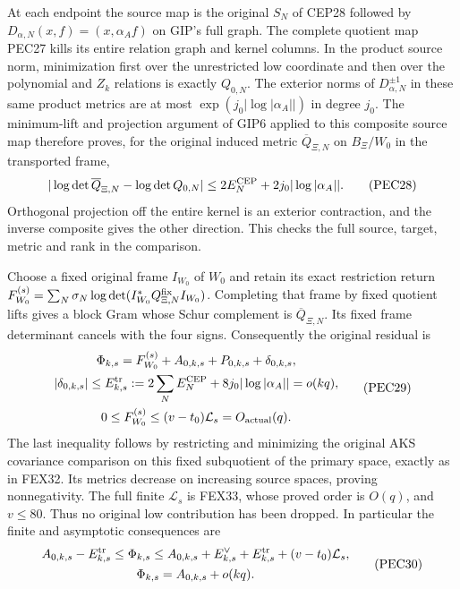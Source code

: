 \documentclass[11pt,a4paper]{article}
\begin{document}
At each endpoint the source map is the original $S_N$ of CEP28
followed by $D_{\alpha,N}(x,f)=(x,\alpha_Af)$ on GIP's full graph.
The complete quotient map PEC27 kills its entire relation graph and
kernel columns. In the product source norm, minimization first over
the unrestricted low coordinate and then over the polynomial and
$Z_k$ relations is exactly $Q_{0,N}$. The exterior norms of
$D_{\alpha,N}^{\pm1}$ in these same product metrics are at most
$\exp(j_0|\log|\alpha_A||)$ in degree $j_0$.
The minimum-lift and projection argument of GIP6 applied to this
composite source map therefore proves, for the original induced
metric $\overline Q_{\Xi,N}$ on $B_\Xi/W_0$ in the transported frame,
\[
 |\log\det\overline Q_{\Xi,N}-\log\det Q_{0,N}|
 \le2E_N^{\rm CEP}+2j_0|\log|\alpha_A||.
 \tag{PEC28}
\]
Orthogonal projection off the entire kernel is an exterior contraction,
and the inverse composite gives the other direction. This checks the
full source, target, metric and rank in the comparison.

Choose a fixed original frame $I_{W_0}$ of $W_0$ and retain its exact
restriction return
$F_{W_0}^{(s)}=\sum_N\sigma_N\log\det(I_{W_0}^*Q_{\Xi,N}^{\rm fix}I_{W_0})$.
Completing that frame by fixed quotient lifts gives a block Gram whose
Schur complement is $\overline Q_{\Xi,N}$. Its fixed frame determinant
cancels with the four signs. Consequently the original residual is
\[
\begin{gathered}
 \Phi_{k,s}=F_{W_0}^{(s)}+A_{0,k,s}+P_{0,k,s}+\delta_{0,k,s},\\
 |\delta_{0,k,s}|\le E_{k,s}^{\rm tr}
 :=2\sum_NE_N^{\rm CEP}+8j_0|\log|\alpha_A||=o(kq),\\
 0\le F_{W_0}^{(s)}\le(v-t_0)\mathcal L_s=O_{\rm actual}(q).
\end{gathered}\tag{PEC29}
\]
The last inequality follows by restricting and minimizing the original
AKS covariance comparison on this fixed subquotient of the primary
space, exactly as in FEX32. Its metrics decrease on increasing source
spaces, proving nonnegativity. The full finite $\mathcal L_s$ is FEX33,
whose proved order is $O(q)$, and $v\le80$. Thus no original low
contribution has been dropped. In particular the finite and asymptotic
consequences are
\[
\begin{gathered}
 A_{0,k,s}-E_{k,s}^{\rm tr}\le\Phi_{k,s}
 \le A_{0,k,s}+E_{k,s}^{\vee}+E_{k,s}^{\rm tr}
                          +(v-t_0)\mathcal L_s,\\
 \Phi_{k,s}=A_{0,k,s}+o(kq).
\end{gathered}\tag{PEC30}
\]
\end{document}
